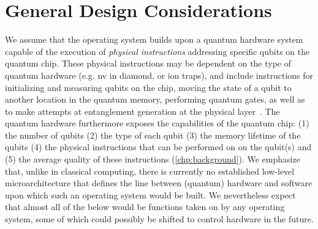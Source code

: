 \section{General Design Considerations}
\label{sec:arch:considerations}

We assume that the operating system builds upon a quantum hardware system capable of the execution
of \emph{physical instructions} addressing specific qubits on the quantum chip. These physical
instructions may be dependent on the type of quantum hardware (e.g. \acrshort{nv} in diamond, or ion
traps), and include instructions for initializing and measuring qubits on the chip, moving the state
of a qubit to another location in the quantum memory, performing quantum gates, as well as to make
attempts at entanglement generation at the physical layer~\cite{pompili_2022_experimental}. The
quantum hardware furthermore exposes the capabilities of the quantum chip: (1) the number of qubits
(2) the type of each qubit (3) the memory lifetime of the qubits (4) the physical instructions that
can be performed on on the qubit(s) and (5) the average quality of these instructions
(\cref{chp:background}). We emphasize that, unlike in classical computing, there is currently no
established low-level microarchitecture that defines the line between (quantum) hardware and
software upon which such an operating system would be built. We nevertheless expect that almost all
of the below would be functions taken on by any operating system, some of which could possibly be
shifted to control hardware in the future.

